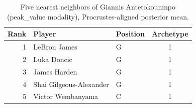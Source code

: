 \begin{table}[htbp]
  \centering\small
  \begin{tabular}{rllc}
    \toprule
    Rank & Player & Position & Archetype \\
    \midrule
    1 & LeBron James & G & 1 \\
    2 & Luka Doncic & G & 1 \\
    3 & James Harden & G & 1 \\
    4 & Shai Gilgeous-Alexander & G & 1 \\
    5 & Victor Wembanyama & C & 1 \\
    \bottomrule
  \end{tabular}
  \caption{Five nearest neighbors of Giannis Antetokounmpo (peak_value modality), Procrustes-aligned posterior mean.}
  \label{tab:Giannis_Antetokounmpo_neighbors_peak_value}
\end{table}

